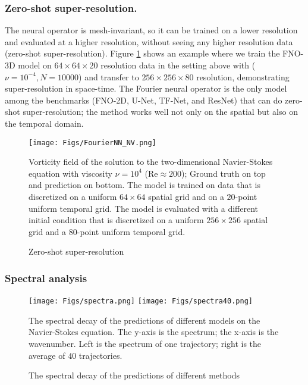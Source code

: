 \subsubsection{Zero-shot super-resolution.}
\label{sec:superresolution}


The neural operator is mesh-invariant, so it can be trained on a lower resolution and evaluated at a higher resolution, without seeing any higher resolution data (zero-shot super-resolution).
Figure 
\ref{fig:super2} shows an example where we train the FNO-3D model on $64 \times 64 \times 20$ resolution data in the setting above with ($\nu=10^{-4}, N=10000$) and transfer to $256 \times 256 \times 80$ resolution, demonstrating super-resolution in space-time. The
Fourier neural operator is the only model among the benchmarks (FNO-2D, U-Net, TF-Net, and ResNet) that can do zero-shot super-resolution;
the method works well not only on the spatial but also on the temporal domain.


\begin{figure}[ht]
    \centering
    \texttt{[image: Figs/FourierNN\_NV.png]}
    \caption{ Zero-shot super-resolution}
    \label{fig:super2} 
    \small{ Vorticity field of the solution to the two-dimensional Navier-Stokes equation with viscosity $\nu =10^{4}$
    (Re$\approx200$); Ground truth on top and prediction on bottom. The model is trained on data that is discretized on a uniform $64\times64$ spatial grid and on a $20$-point uniform temporal grid. The model is evaluated with a different initial condition that is discretized on a uniform $256\times256$ spatial grid and a $80$-point uniform temporal grid. %
    }
\end{figure}



\subsubsection{Spectral analysis}
\begin{figure}[t]
    \centering
    \texttt{[image: Figs/spectra.png]}
    \texttt{[image: Figs/spectra40.png]}
        \caption{The spectral decay of the predictions of different methods}\label{fig:spectra}
    \small{
    The spectral decay of the predictions of different models on the Navier-Stokes equation. The y-axis is the spectrum; the x-axis is the wavenumber. Left is the spectrum of one trajectory; right is the average of $40$ trajectories. }
\end{figure}

